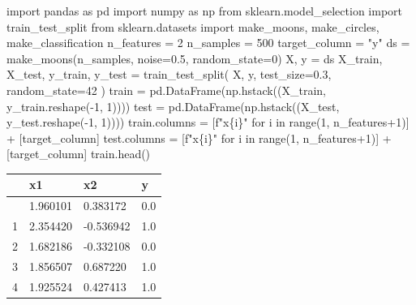 \documentclass[
  letterpaper,
  DIV=11,
  numbers=noendperiod]{scrreprt}
\newenvironment{Shaded}{\begin{snugshade}}{\end{snugshade}}
\newcommand{\BuiltInTok}[1]{\textcolor[rgb]{0.00,0.23,0.31}{#1}}
\newcommand{\ControlFlowTok}[1]{\textcolor[rgb]{0.00,0.23,0.31}{#1}}
\newcommand{\DecValTok}[1]{\textcolor[rgb]{0.68,0.00,0.00}{#1}}
\newcommand{\FloatTok}[1]{\textcolor[rgb]{0.68,0.00,0.00}{#1}}
\newcommand{\ImportTok}[1]{\textcolor[rgb]{0.00,0.46,0.62}{#1}}
\newcommand{\KeywordTok}[1]{\textcolor[rgb]{0.00,0.23,0.31}{#1}}
\newcommand{\NormalTok}[1]{\textcolor[rgb]{0.00,0.23,0.31}{#1}}
\newcommand{\OperatorTok}[1]{\textcolor[rgb]{0.37,0.37,0.37}{#1}}
\newcommand{\SpecialCharTok}[1]{\textcolor[rgb]{0.37,0.37,0.37}{#1}}
\newcommand{\SpecialStringTok}[1]{\textcolor[rgb]{0.13,0.47,0.30}{#1}}
\newcommand{\StringTok}[1]{\textcolor[rgb]{0.13,0.47,0.30}{#1}}
\begin{document}
\begin{Shaded}
\begin{Highlighting}[]
\ImportTok{import}\NormalTok{ pandas }\ImportTok{as}\NormalTok{ pd}
\ImportTok{import}\NormalTok{ numpy }\ImportTok{as}\NormalTok{ np}
\ImportTok{from}\NormalTok{ sklearn.model\_selection }\ImportTok{import}\NormalTok{ train\_test\_split}
\ImportTok{from}\NormalTok{ sklearn.datasets }\ImportTok{import}\NormalTok{ make\_moons, make\_circles, make\_classification}
\NormalTok{n\_features }\OperatorTok{=} \DecValTok{2}
\NormalTok{n\_samples }\OperatorTok{=} \DecValTok{500}
\NormalTok{target\_column }\OperatorTok{=} \StringTok{"y"}
\NormalTok{ds }\OperatorTok{=}\NormalTok{  make\_moons(n\_samples, noise}\OperatorTok{=}\FloatTok{0.5}\NormalTok{, random\_state}\OperatorTok{=}\DecValTok{0}\NormalTok{)}
\NormalTok{X, y }\OperatorTok{=}\NormalTok{ ds}
\NormalTok{X\_train, X\_test, y\_train, y\_test }\OperatorTok{=}\NormalTok{ train\_test\_split(}
\NormalTok{    X, y, test\_size}\OperatorTok{=}\FloatTok{0.3}\NormalTok{, random\_state}\OperatorTok{=}\DecValTok{42}
\NormalTok{)}
\NormalTok{train }\OperatorTok{=}\NormalTok{ pd.DataFrame(np.hstack((X\_train, y\_train.reshape(}\OperatorTok{{-}}\DecValTok{1}\NormalTok{, }\DecValTok{1}\NormalTok{))))}
\NormalTok{test }\OperatorTok{=}\NormalTok{ pd.DataFrame(np.hstack((X\_test, y\_test.reshape(}\OperatorTok{{-}}\DecValTok{1}\NormalTok{, }\DecValTok{1}\NormalTok{))))}
\NormalTok{train.columns }\OperatorTok{=}\NormalTok{ [}\SpecialStringTok{f"x}\SpecialCharTok{\{}\NormalTok{i}\SpecialCharTok{\}}\SpecialStringTok{"} \ControlFlowTok{for}\NormalTok{ i }\KeywordTok{in} \BuiltInTok{range}\NormalTok{(}\DecValTok{1}\NormalTok{, n\_features}\OperatorTok{+}\DecValTok{1}\NormalTok{)] }\OperatorTok{+}\NormalTok{ [target\_column]}
\NormalTok{test.columns }\OperatorTok{=}\NormalTok{ [}\SpecialStringTok{f"x}\SpecialCharTok{\{}\NormalTok{i}\SpecialCharTok{\}}\SpecialStringTok{"} \ControlFlowTok{for}\NormalTok{ i }\KeywordTok{in} \BuiltInTok{range}\NormalTok{(}\DecValTok{1}\NormalTok{, n\_features}\OperatorTok{+}\DecValTok{1}\NormalTok{)] }\OperatorTok{+}\NormalTok{ [target\_column]}
\NormalTok{train.head()}
\end{Highlighting}
\end{Shaded}

\begin{longtable}[]{@{}llll@{}}
\toprule\noalign{}
& x1 & x2 & y \\
\midrule\noalign{}
\endhead
\bottomrule\noalign{}
\endlastfoot
0 & 1.960101 & 0.383172 & 0.0 \\
1 & 2.354420 & -0.536942 & 1.0 \\
2 & 1.682186 & -0.332108 & 0.0 \\
3 & 1.856507 & 0.687220 & 1.0 \\
4 & 1.925524 & 0.427413 & 1.0 \\
\end{longtable}
\end{document}

